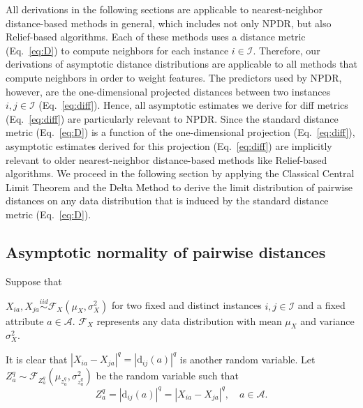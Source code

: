 \documentclass[aoas]{imsart}
\begin{document}
All derivations in the following sections are applicable to nearest-neighbor distance-based methods in general, which includes not only NPDR, but also Relief-based algorithms. Each of these methods uses a distance metric (Eq.~\ref{eq:D}) to compute neighbors for each instance $i \in \mathcal{I}$. Therefore, our derivations of asymptotic distance distributions are applicable to all methods that compute neighbors in order to weight features. The predictors used by NPDR, however, are the one-dimensional projected distances between two instances $i,j \in \mathcal{I}$ (Eq.~\ref{eq:diff}). Hence, all asymptotic estimates we derive for diff metrics (Eq.~\ref{eq:diff}) are particularly relevant to NPDR. Since the standard distance metric (Eq.~\ref{eq:D}) is a function of the one-dimensional projection (Eq.~\ref{eq:diff}), asymptotic estimates derived for this projection (Eq.~\ref{eq:diff}) are implicitly relevant to older nearest-neighbor distance-based methods like Relief-based algorithms. We proceed in the following section by applying the Classical Central Limit Theorem and the Delta Method to derive the limit distribution of pairwise distances on any data distribution that is induced by the standard distance metric (Eq.~\ref{eq:D}).

\subsection{Asymptotic normality of pairwise distances}

Suppose that 

\noindent $X_{ia}, X_{ja} \overset{iid}{\sim} \mathcal{F}_X\left(\mu_X,\sigma^2_X\right)$ for two fixed and distinct instances $i,j \in \mathcal{I}$ and a fixed attribute $a \in \mathcal{A}$.
$\mathcal{F}_X$ represents any data distribution with mean $\mu_X$ and variance $\sigma^2_X$.

It is clear that $|X_{ia} - X_{ja}|^q = |\text{d}_{ij}(a)|^q$ is another random variable. Let $Z^q_a \sim \mathcal{F}_{Z^q_a}\left(\mu_{z^q_a},\sigma^2_{z^q_a}\right)$ be the random variable such that
%
\begin{equation}\label{eq:diffDistr}
Z^q_a = |\text{d}_{ij}(a)|^q = |X_{ia} - X_{ja}|^q, \quad a \in \mathcal{A}.
\end{equation}
\end{document}
